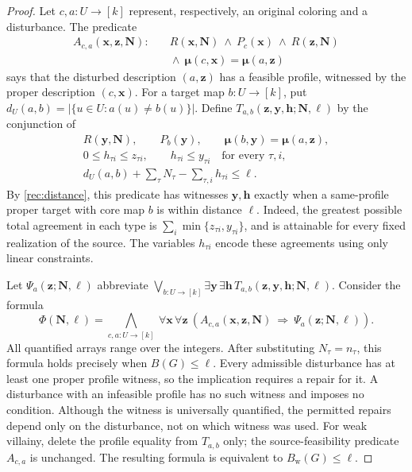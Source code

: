 \documentclass[10pt,a4paper]{amsart}
\numberwithin{equation}{section}
\theoremstyle{definition}
\theoremstyle{remark}
\begin{document}
\begin{proof}
Let $c,a:U\to[k]$ represent, respectively, an original coloring and
a disturbance. The predicate
\[
\begin{aligned}
A_{c,a}(\mathbf x,\mathbf z,\mathbf N):\quad&
R(\mathbf x,\mathbf N)\ \wedge\ P_c(\mathbf x)\
\wedge\ R(\mathbf z,\mathbf N)\\
&{}\wedge\
\boldsymbol\mu(c,\mathbf x)=\boldsymbol\mu(a,\mathbf z)
\end{aligned}
\]
says that the disturbed description $(a,\mathbf z)$ has a feasible
profile, witnessed by the proper description $(c,\mathbf x)$.
For a target map $b:U\to[k]$, put
$d_U(a,b)=|\{u\in U:a(u)\ne b(u)\}|$. Define
$T_{a,b}(\mathbf z,\mathbf y,\mathbf h;\mathbf N,\ell)$ by the
conjunction of
\[
\begin{gathered}
R(\mathbf y,\mathbf N),\qquad P_b(\mathbf y),\qquad
\boldsymbol\mu(b,\mathbf y)=\boldsymbol\mu(a,\mathbf z),\\
0\leq h_{\tau i}\leq z_{\tau i},\qquad
h_{\tau i}\leq y_{\tau i}\quad\text{for every }\tau,i,\\
d_U(a,b)+\sum_\tau N_\tau-\sum_{\tau,i}h_{\tau i}\leq\ell.
\end{gathered}
\]
By \cref{rec:distance}, this predicate has witnesses
$\mathbf y,\mathbf h$ exactly when a same-profile proper target
with core map $b$ is within distance $\ell$. Indeed, the greatest
possible total agreement in each type is
$\sum_i\min\{z_{\tau i},y_{\tau i}\}$, and is attainable for every
fixed realization of the source. The variables $h_{\tau i}$
encode these agreements using only linear constraints.

Let $\Psi_a(\mathbf z;\mathbf N,\ell)$ abbreviate
$\bigvee_{b:U\to[k]}\exists\mathbf y\,\exists\mathbf h\,
T_{a,b}(\mathbf z,\mathbf y,\mathbf h;\mathbf N,\ell)$.
Consider the formula
\begin{equation}\label{rec:presburger}
\Phi(\mathbf N,\ell)=
\bigwedge_{c,a:U\to[k]}\ \forall\mathbf x\,\forall\mathbf z\
\left(
A_{c,a}(\mathbf x,\mathbf z,\mathbf N)
\ \Longrightarrow\
\Psi_a(\mathbf z;\mathbf N,\ell)
\right).
\end{equation}
All quantified arrays range over the integers. After substituting
$N_\tau=n_\tau$, this formula holds precisely when $B(G)\leq\ell$.
Every admissible disturbance has at least one proper profile witness,
so the implication requires a repair for it. A disturbance with an
infeasible profile has no such witness and imposes no condition.
Although the witness is universally quantified, the permitted repairs
depend only on the disturbance, not on which witness was used.
For weak villainy, delete the profile equality from $T_{a,b}$ only;
the source-feasibility predicate $A_{c,a}$ is unchanged. The resulting
formula is equivalent to $B_{\mathrm w}(G)\leq\ell$.


\end{proof}
\end{document}
